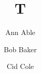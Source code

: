 \documentclass{cas-sc}
\begin{document}
\title [mode = title]{T}
\author[1]{Ann Able}
\author[2]{Bob Baker}
\author[aff1]{Cid Cole}
\address[aff2]{Univ X}
\address[aff1]{Univ Y}
\maketitle
\end{document}
